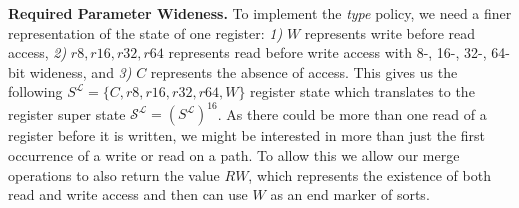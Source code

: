 
\textbf{Required Parameter Wideness.}
\label{subsection:requiredparamwideness}
To implement the \emph{type} policy, we need a finer representation of the state of one register:
\textit{1)} $W$ represents write before read access,
\textit{2)} $r8, r16, r32, r64$ represents read before write access with 8-, 16-, 32-, 64-bit wideness, and
\textit{3)} $C$ represents the absence of access.
This gives us the following $S^\mathcal{L} = \{ C, r8, r16, r32, r64, W \}$ register state which translates to the register super state 
$\mathcal{S}^\mathcal{L} = (S^\mathcal{L})^{16}$.
As there could be more than one read of a register before it is written, we might be interested in more than just the first occurrence of a write or read on a path. 
To allow this we allow our merge operations to also return the value $RW$, which represents the existence of both read and write access and then can use $W$ as an end 
marker of sorts.
